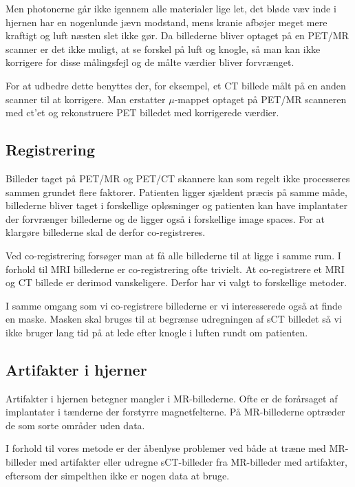 Men photonerne går ikke igennem alle materialer lige let, det bløde væv
inde i hjernen har en nogenlunde jævn modstand, mens kranie afbøjer meget
mere kraftigt og luft næsten slet ikke gør. Da billederne bliver optaget
på en PET/MR scanner er det ikke muligt, at se forskel på luft og knogle,
så man kan ikke korrigere for disse målingsfejl og de målte værdier bliver
forvrænget.

For at udbedre dette benyttes der, for eksempel, et CT billede målt på en anden
scanner til at korrigere. Man erstatter $\mu$-mappet optaget på PET/MR scanneren
med ct'et og rekonstruere PET billedet med korrigerede værdier.



\subsection{Registrering}


Billeder taget på PET/MR og PET/CT skannere kan som regelt ikke processeres
sammen grundet flere faktorer. Patienten ligger sjældent præcis på samme
måde, billederne bliver taget i forskellige opløsninger og patienten kan have
implantater der forvrænger billederne og de ligger også i forskellige image
spaces. For at klargøre billederne skal de derfor co-registreres.

Ved co-registrering forsøger man at få alle billederne til at ligge i samme
rum. I forhold til MRI billederne er co-registrering ofte trivielt. At
co-registrere et MRI og CT billede er derimod vanskeligere. Derfor har vi valgt
to forskellige metoder.



I samme omgang som vi co-registrere billederne er vi interesserede også
at finde en maske. Masken skal bruges til at begrænse udregningen af sCT
billedet så vi ikke bruger lang tid på at lede efter knogle i luften rundt om
patienten.


\subsection{Artifakter i hjerner}
Artifakter i hjernen betegner mangler i MR-billederne. Ofte er de forårsaget
af implantater i tænderne der forstyrre magnetfelterne. På MR-billederne optræder
de som sorte områder uden data.

I forhold til vores metode er der åbenlyse problemer ved både at træne med MR-billeder
med artifakter eller udregne sCT-billeder fra MR-billeder med artifakter, eftersom der
simpelthen ikke er nogen data at bruge.

